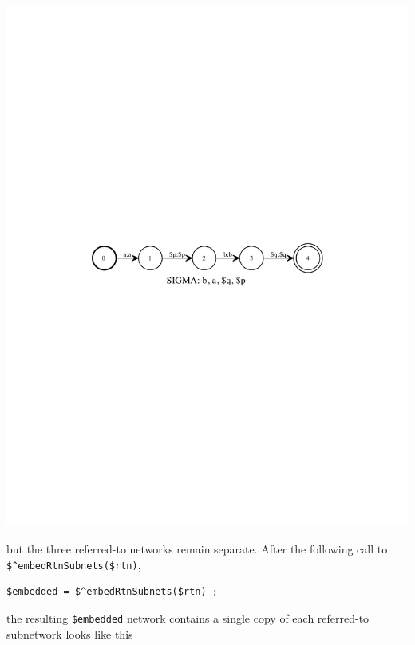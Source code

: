\documentclass[letterpaper,12pt]{article}
\begin{document}
\begin{center}
\includegraphics[width=\textwidth]{images/sapTwoReferences.pdf}
\end{center}

\noindent
but the three referred-to networks remain separate.  After the following
call to \verb!$^embedRtnSubnets($rtn)!, 

\begin{Verbatim}[fontsize=\small]
$embedded = $^embedRtnSubnets($rtn) ;
\end{Verbatim}


\noindent
the resulting \verb!$embedded! network contains a single copy of each
referred-to subnetwork looks like this
\end{document}

